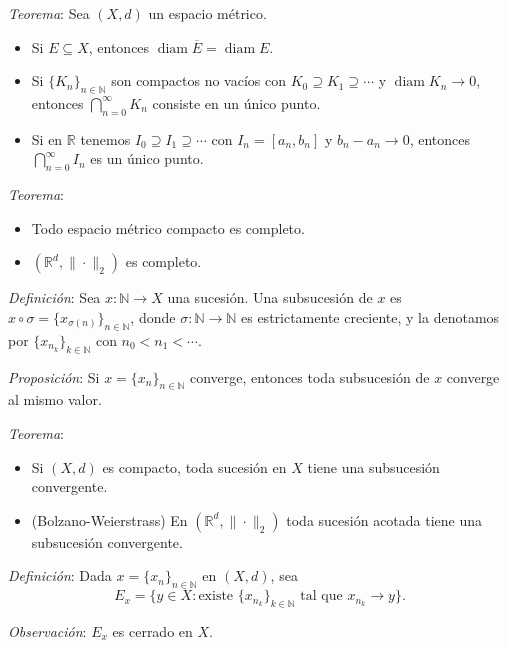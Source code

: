 \documentclass{beamer}
\begin{document}
  \begin{frame}
    \textit{Teorema}: Sea $(X, d)$ un espacio métrico.
    \pause
    \begin{itemize}[<+->]
      \item Si $E \subseteq X$, entonces
      $\operatorname{diam} \overline{E} = \operatorname{diam} E$.
      \item Si $\{K_n\}_{n \in \mathbb{N}}$ son compactos no vacíos con
      $K_0 \supseteq K_1 \supseteq \cdots$ y $\operatorname{diam} K_n \to 0$,
      entonces $\bigcap_{n=0}^{\infty} K_n$ consiste en un único punto.
      \item Si en $\mathbb{R}$ tenemos $I_0 \supseteq I_1 \supseteq \cdots$ con
      $I_n = [a_n, b_n]$ y $b_n - a_n \to 0$, entonces
      $\bigcap_{n=0}^{\infty} I_n$ es un único punto.
    \end{itemize}
    \pause

    \textit{Teorema}:
    \begin{itemize}[<+->]
      \item Todo espacio métrico compacto es completo.
      \item $(\mathbb{R}^d, \|\cdot\|_2)$ es completo.
    \end{itemize}
  \end{frame}

  \begin{frame}
    \textit{Definición}: Sea $x: \mathbb{N} \to X$ una sucesión. Una subsucesión
    de $x$ es $x \circ \sigma = \{x_{\sigma(n)}\}_{n \in \mathbb{N}}$, donde
    $\sigma: \mathbb{N} \to \mathbb{N}$ es estrictamente creciente, y la
    denotamos por $\{x_{n_k}\}_{k \in \mathbb{N}}$ con $n_0 < n_1 < \cdots$.
    \newline\newline
    \pause

    \textit{Proposición}: Si $x = \{x_n\}_{n \in \mathbb{N}}$ converge, entonces
    toda subsucesión de $x$ converge al mismo valor.
  \end{frame}

  \begin{frame}
    \textit{Teorema}:
    \begin{itemize}[<+->]
      \item Si $(X, d)$ es compacto, toda sucesión en $X$ tiene una subsucesión
      convergente.
      \item (Bolzano-Weierstrass) En $(\mathbb{R}^d, \|\cdot\|_2)$ toda sucesión
      acotada tiene una subsucesión convergente.
    \end{itemize}
    \pause

    \textit{Definición}: Dada $x = \{x_n\}_{n \in \mathbb{N}}$ en $(X, d)$, sea
    \[
      E_x = \{y \in X : \text{existe } \{x_{n_k}\}_{k \in \mathbb{N}}
      \text{ tal que } x_{n_k} \to y\}.
    \]
    \pause

    \textit{Observación}: $E_x$ es cerrado en $X$.
  \end{frame}
\end{document}
